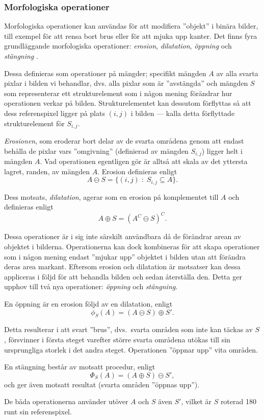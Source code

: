 \documentclass[../rapport_MVEX01-11-05]{subfiles}
\begin{document}
\subsubsection{Morfologiska operationer}\label{sec:morph}

Morfologiska operationer kan användas för att modifiera ''objekt'' i
binära bilder, till exempel för att rensa bort brus eller för att
mjuka upp kanter. Det finns fyra grundläggande morfologiska
operationer: \emph{erosion}, \emph{dilatation}, \emph{öppning} och
\emph{stängning} \cite[s.~25]{Rudemo09}.

Dessa definieras som operationer på mängder; specifikt mängden $A$
av alla svarta pixlar i bilden vi behandlar, dvs. alla pixlar som är
''avstängda'' och mängden $S$ som representerar ett strukturelement
som i någon mening förändrar hur operationen verkar på bilden.
Strukturelementet kan dessutom förflyttas så att dess referenspixel
ligger på plats $(i,j)$ i bilden --- kalla detta förflyttade
strukturelement för $S_{i,j}$.

\emph{Erosionen}, som eroderar bort delar av de svarta områdena genom
att endast behålla de pixlar vars ''omgivning'' (definierad av mängden
$S_{i,j}$) ligger helt i mängden $A$. Vad operationen egentligen gör är alltså
att skala av det yttersta lagret, randen, av mängden $A$. Erosion definieras enligt
\begin{equation*}
  A\ominus S = \{(i,j)\;:\;S_{i,j}\subseteq A\}.
\end{equation*}

Dess motsats, \emph{dilatation}, agerar som
en erosion på komplementet till $A$ och definieras enligt
\begin{equation*}
  A\oplus S = (A^C\ominus S)^C.
\end{equation*}

Dessa operationer är i sig inte särskilt användbara då de förändrar
arean av objektet i bilderna. Operationerna kan dock kombineras för
att skapa operationer som i någon mening endast 
''mjukar upp'' objektet i bilden utan att förändra deras area markant.
Eftersom erosion och dilatation är motsatser kan dessa appliceras i
följd för att behandla bilden och
sedan återställa den. Detta ger upphov till två nya operationer:
\emph{öppning} och \emph{stängning}.

En öppning är en erosion följd av en dilatation, enligt
\begin{equation*}
  \phi_S(A)=(A\ominus S)\oplus S'.
\end{equation*}

Detta resulterar i att svart ''brus'', dvs.~svarta områden som inte kan täckas
av $S$, försvinner i
första steget varefter större svarta områdena utökas till sin ursprungliga
storlek i det andra
steget. Operationen ''öppnar upp'' vita områden.

En stängning består av motsatt procedur, enligt
\begin{equation*}
  \Phi_S(A)=(A\oplus S)\ominus S',
\end{equation*}
och ger även motsatt resultat (svarta områden ''öppnas upp'').

De
båda operationerna använder utöver $A$ och $S$ även $S'$, vilket är
$S$ roterad 180\textdegree{} runt sin referenspixel.
\end{document}

